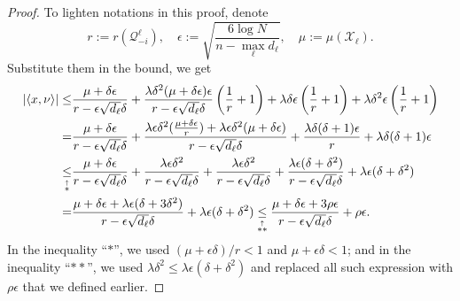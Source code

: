\documentclass[twoside,11pt]{article}
\numberwithin{equation}{section}
\newcommand{\explain}[2]{\underset{\mathclap{\overset{\uparrow}{#2}}}{#1}}
\begin{document}
\begin{proof}
To lighten notations in this proof, denote $$r:=r(\mathcal{Q}_{-i}^{\ell}), \quad\epsilon := \sqrt{\frac{6\log N}{n-\max_{\ell}{d_{\ell}}}},\quad \mu:=\mu(\mathcal{X}_{\ell}).$$
Substitute them in the bound, we get
  \begin{align}
    |\langle x, \nu \rangle| \leq& \frac{\mu+\delta\epsilon}{r-\epsilon \sqrt{d_{\ell}}\delta}+\frac{\lambda\delta^2(\mu+\delta\epsilon)\epsilon}{r-\epsilon \sqrt{d_{\ell}}\delta}\left(\frac{1}{r}+1\right)
    +\lambda \delta \epsilon \left(\frac{1}{r}+1\right)
    + \lambda \delta^2\epsilon\left(\frac{1}{r}+1\right)\nonumber\\
    =& \frac{\mu+\delta\epsilon}{r-\epsilon \sqrt{d_{\ell}}\delta}+
    \frac{\lambda\epsilon\delta^2(\frac{\mu+\delta\epsilon}{r}) + \lambda\epsilon\delta^2(\mu+\delta\epsilon)}{r-\epsilon \sqrt{d_{\ell}}\delta}+\frac{\lambda\delta(\delta+1)\epsilon}{r}+\lambda\delta(\delta+1)\epsilon\nonumber\\
    \explain{\leq}{*}&\frac{\mu+\delta\epsilon}{r-\epsilon \sqrt{d_{\ell}}\delta}+
    \frac{\lambda \epsilon \delta^2}{r-\epsilon \sqrt{d_{\ell}}\delta} + \frac{\lambda \epsilon\delta^2}{r-\epsilon \sqrt{d_{\ell}}\delta} + \frac{\lambda \epsilon(\delta+\delta^2)}{r-\epsilon \sqrt{d_{\ell}}\delta} + \lambda\epsilon (\delta+\delta^2)
     \nonumber\\
     =& \frac{\mu+\delta\epsilon + \lambda \epsilon(\delta+3\delta^2)}{r-\epsilon \sqrt{d_{\ell}}\delta}+ \lambda \epsilon (\delta+\delta^2) \explain{\leq}{**} \frac{\mu+\delta\epsilon + 3\rho \epsilon}{r-\epsilon \sqrt{d_{\ell}}\delta}+ \rho \epsilon.\label{eq:derive_dual_sep_rand}
  \end{align}
In the inequality ``$*$'', we used $(\mu+\epsilon\delta)/r <1$ and $\mu + \epsilon\delta <1$; and in the inequality ``$**$'', we used $\lambda \delta^2 \leq \lambda\epsilon (\delta +\delta^2)$ and replaced all such expression with $\rho\epsilon$ that we defined earlier.



\end{proof}
\end{document}
